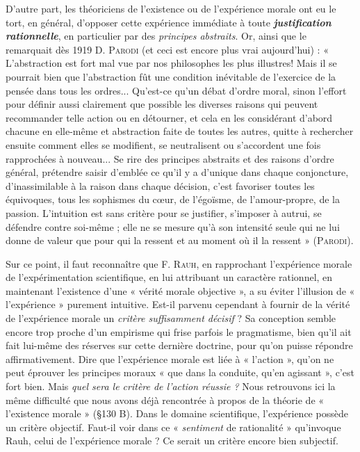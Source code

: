 D’autre part, les théoriciens de l'existence ou de l'expérience
morale ont eu le tort, en général, d’opposer cette expérience immédiate
à toute \textbf{\textit {justification rationnelle}}, en particulier par des {\it principes
abstraits}. Or, ainsi que le remarquait dès 1919 D. \textsc{Parodi}
(et ceci est encore plus vrai aujourd’hui) : « L’abstraction est fort
mal vue par nos philosophes les plus illustres! Mais il se pourrait
bien que l’abstraction fût une condition inévitable de l'exercice de
la pensée dans tous les ordres... Qu'est-ce qu’un débat d’ordre moral,
sinon l'effort pour définir aussi clairement que possible les diverses
raisons qui peuvent recommander telle action ou en détourner, et
cela en les considérant d’abord chacune en elle-même et abstraction
faite de toutes les autres, quitte à rechercher ensuite comment elles
se modifient, se neutralisent ou s’accordent une fois rapprochées à
nouveau... Se rire des principes abstraits et des raisons d’ordre général,
prétendre saisir d'emblée ce qu’il y a d’unique dans chaque conjoncture,
d’inassimilable à la raison dans chaque décision, c’est favoriser
toutes les équivoques, tous les sophismes du cœur, de l’égoïsme,
de l’amour-propre, de la passion. L’intuition est sans critère pour se
justifier, s’imposer à autrui, se défendre contre soi-même ; elle ne se
mesure qu’à son intensité seule qui ne lui donne de valeur que pour
qui la ressent et au moment où il la ressent » (\textsc{Parodi}).

Sur ce point, il faut reconnaître que F. \textsc{Rauh}, en rapprochant
l’expérience morale de l’expérimentation scientifique, en lui attribuant
un caractère rationnel, en maintenant l'existence d’une « vérité
morale objective », a su éviter l’illusion de « l’expérience » purement
intuitive. Est-il parvenu cependant à fournir de la vérité de l’expérience
morale un {\it critère suffisamment décisif} ? Sa conception semble
encore trop proche d’un empirisme qui frise parfois le pragmatisme,
bien qu'il ait fait lui-même des réserves sur cette dernière doctrine,
pour qu’on puisse répondre affirmativement. Dire que l’expérience
morale est liée à « l’action », qu’on ne peut éprouver les principes
moraux « que dans la conduite, qu’en agissant », c’est fort bien.
Mais {\it quel sera le critère de l’action réussie ?} Nous retrouvons ici la
même difficulté que nous avons déjà rencontrée à propos de la théorie
de « l’existence morale » (\S 130 B). Dans le domaine scientifique,
l'expérience possède un critère objectif. Faut-il voir dans ce « {\it sentiment}
de rationalité » qu’invoque Rauh, celui de l’expérience morale ?
Ce serait un critère encore bien subjectif.

